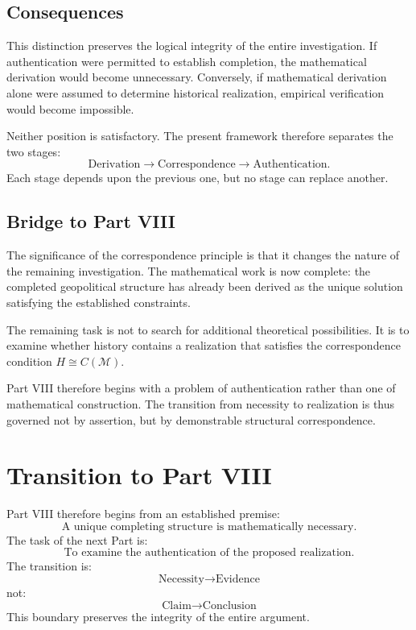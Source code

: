 \documentclass[11pt,openany]{book}
\theoremstyle{plain}
\theoremstyle{definition}
\begin{document}
\subsection*{Consequences}

This distinction preserves the logical integrity of the entire investigation. If authentication were permitted to establish completion, the mathematical derivation would become unnecessary. Conversely, if mathematical derivation alone were assumed to determine historical realization, empirical verification would become impossible.

Neither position is satisfactory. The present framework therefore separates the two stages:
\[
\boxed{
\text{Derivation} \longrightarrow \text{Correspondence} \longrightarrow \text{Authentication}.
}
\]
Each stage depends upon the previous one, but no stage can replace another.

\subsection*{Bridge to Part VIII}

The significance of the correspondence principle is that it changes the nature of the remaining investigation. The mathematical work is now complete: the completed geopolitical structure has already been derived as the unique solution satisfying the established constraints.

The remaining task is not to search for additional theoretical possibilities. It is to examine whether history contains a realization that satisfies the correspondence condition \(H \cong C(\mathcal{M})\).

Part VIII therefore begins with a problem of authentication rather than one of mathematical construction. The transition from necessity to realization is thus governed not by assertion, but by demonstrable structural correspondence.

\section{Transition to Part VIII}

Part VIII therefore begins from an established premise:
\[
\boxed{
\text{A unique completing structure is mathematically necessary.}
}
\]
The task of the next Part is:
\[
\boxed{
\text{To examine the authentication of the proposed realization.}
}
\]
The transition is:
\[
\text{Necessity} \longrightarrow \text{Evidence}
\]
not:
\[
\text{Claim} \longrightarrow \text{Conclusion}
\]
This boundary preserves the integrity of the entire argument.
\end{document}
